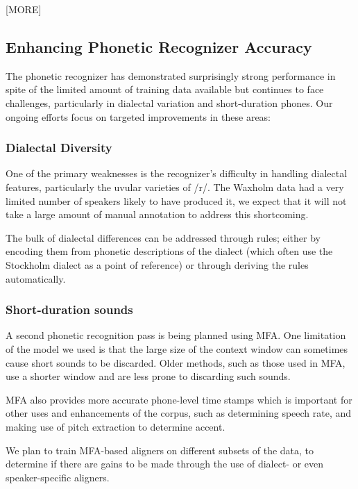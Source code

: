 \documentclass{Interspeech}
\begin{document}
[MORE]

\subsection{Enhancing Phonetic Recognizer Accuracy}

The phonetic recognizer has demonstrated surprisingly strong performance in spite of the limited amount of training data available but continues to face challenges, particularly in dialectal variation and  short-duration phones. Our ongoing efforts focus on targeted improvements in these areas:

\subsubsection{Dialectal Diversity}

One of the primary weaknesses is the recognizer's difficulty in handling dialectal features, particularly the uvular varieties of /r/. The Waxholm data had a very limited number of speakers likely to have produced it, we expect that it will not take a large amount of manual annotation to address this shortcoming.

The bulk of dialectal differences can be addressed through rules; either by encoding them from phonetic descriptions of the dialect (which often use the Stockholm dialect as a point of reference) or through deriving the rules automatically.


\subsubsection{Short-duration sounds}

A second phonetic recognition pass is being planned using MFA. One limitation of the model we used is that the large size of the context window can sometimes cause short sounds to be discarded. Older methods, such as those used in MFA, use a shorter window and are less prone to discarding such sounds.

MFA also provides more accurate phone-level time stamps which is important for other uses and enhancements of the corpus, such as determining speech rate, and making use of pitch extraction to determine accent.

We plan to train MFA-based aligners on different subsets of the data, to determine if there are gains to be made through the use of dialect- or even speaker-specific aligners.
\end{document}
